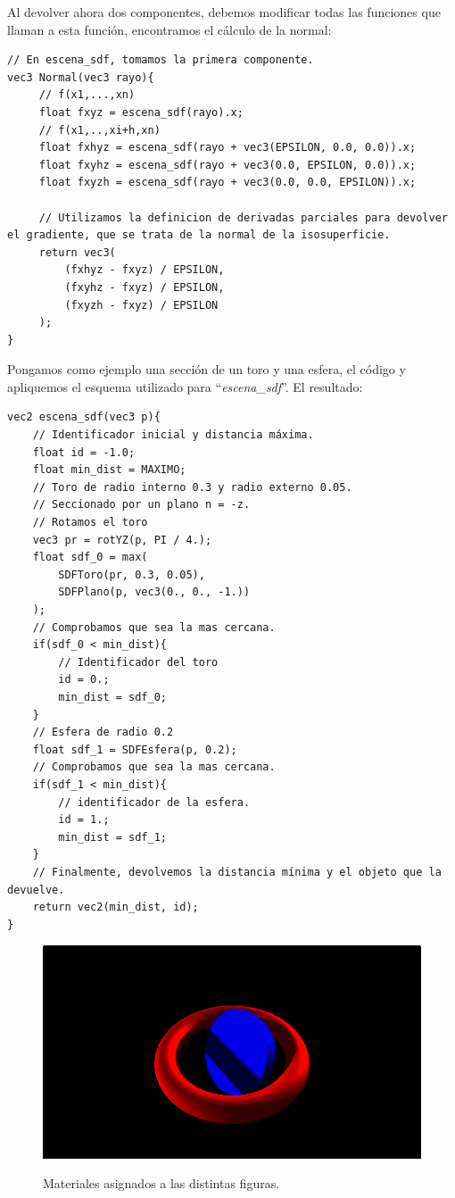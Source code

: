Al devolver ahora dos componentes, debemos modificar todas las funciones que llaman a esta función, encontramos el cálculo de la normal:

\begin{lstlisting}
// En escena_sdf, tomamos la primera componente.
vec3 Normal(vec3 rayo){
     // f(x1,...,xn)
     float fxyz = escena_sdf(rayo).x;
     // f(x1,..,xi+h,xn)
     float fxhyz = escena_sdf(rayo + vec3(EPSILON, 0.0, 0.0)).x;
     float fxyhz = escena_sdf(rayo + vec3(0.0, EPSILON, 0.0)).x;
     float fxyzh = escena_sdf(rayo + vec3(0.0, 0.0, EPSILON)).x;
     
     // Utilizamos la definicion de derivadas parciales para devolver el gradiente, que se trata de la normal de la isosuperficie.
     return vec3(
         (fxhyz - fxyz) / EPSILON,
         (fxyhz - fxyz) / EPSILON,
         (fxyzh - fxyz) / EPSILON
     );
}
\end{lstlisting}

Pongamos como ejemplo una sección de un toro y una esfera, el código y apliquemos el esquema utilizado para \enquote{\textit{escena\_sdf}}. El resultado:

\begin{lstlisting}
vec2 escena_sdf(vec3 p){
    // Identificador inicial y distancia máxima.
    float id = -1.0;
    float min_dist = MAXIMO;
    // Toro de radio interno 0.3 y radio externo 0.05.
    // Seccionado por un plano n = -z.
    // Rotamos el toro 
    vec3 pr = rotYZ(p, PI / 4.);
    float sdf_0 = max(
        SDFToro(pr, 0.3, 0.05),
        SDFPlano(p, vec3(0., 0., -1.))
    );
    // Comprobamos que sea la mas cercana.
    if(sdf_0 < min_dist){
        // Identificador del toro
        id = 0.;
        min_dist = sdf_0;
    }
    // Esfera de radio 0.2
    float sdf_1 = SDFEsfera(p, 0.2);
    // Comprobamos que sea la mas cercana.
    if(sdf_1 < min_dist){
        // identificador de la esfera.
        id = 1.;
        min_dist = sdf_1;
    }
    // Finalmente, devolvemos la distancia mínima y el objeto que la devuelve.
    return vec2(min_dist, id);
}
\end{lstlisting}


\begin{figure}[H]
  \centering
  \captionsetup{justification=centering}%
  \includegraphics[width=1.0\textwidth]{secciones/imagenes/material/materiales.png}\label{fig:material}
  \caption{Materiales asignados a las distintas figuras.}
\end{figure}

